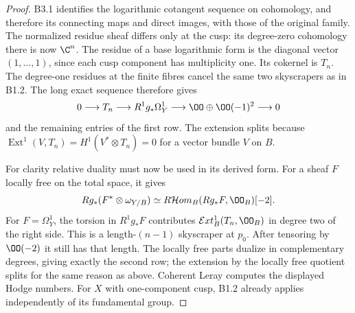 \begin{proof}
B3.1 identifies the logarithmic cotangent sequence on cohomology,
and therefore its connecting maps and direct images, with those of
the original family. The normalized residue sheaf differs only at
the cusp: its degree-zero cohomology there is now $\C^n$.
The residue of a base logarithmic form is the diagonal vector
$(1,\ldots,1)$, since each cusp component has multiplicity one.
Its cokernel is $T_n$. The degree-one residues at the finite fibres
cancel the same two skyscrapers as in B1.2. The long exact sequence
therefore gives
\[
0\longrightarrow T_n\longrightarrow R^1g_*\Omega^1_Y
\longrightarrow\OO\oplus\OO(-1)^2\longrightarrow0
\]
and the remaining entries of the first row. The extension splits
because $\operatorname{Ext}^1(V,T_n)=H^1(V^*\otimes T_n)=0$
for a vector bundle $V$ on $B$.

For clarity relative duality must now be used in its derived form.
For a sheaf $F$ locally free on the total space, it gives
\[
Rg_*(F^*\otimes\omega_{Y/B})
\simeq R\mathcal Hom_B(Rg_*F,\OO_B)[-2].
\]
For $F=\Omega^1_Y$, the torsion in $R^1g_*F$ contributes
$\mathcal Ext^1_B(T_n,\OO_B)$ in degree two of the right side.
This is a length-$(n-1)$ skyscraper at $p_0$. After tensoring by
$\OO(-2)$ it still has that length. The locally free parts dualize
in complementary degrees, giving exactly the second row; the
extension by the locally free quotient splits for the same reason
as above. Coherent Leray computes the displayed Hodge numbers.
For $X$ with one-component cusp, B1.2 already applies independently
of its fundamental group.
\end{proof}

